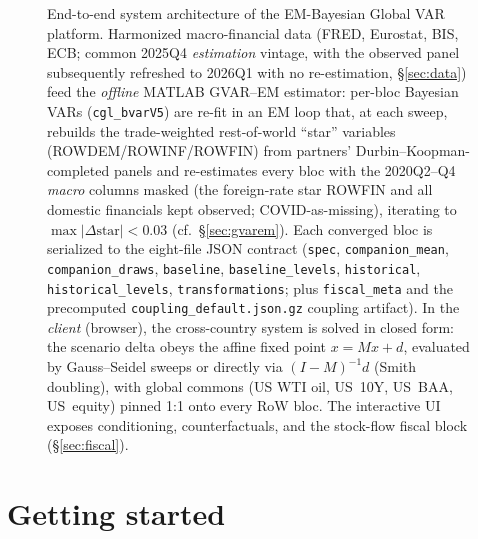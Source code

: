 \documentclass[11pt]{article}
\theoremstyle{plain}
\theoremstyle{remark}
\begin{document}
\begin{figure}[!ht]
{%
}
\caption[End-to-end system architecture]{End-to-end system architecture of the EM-Bayesian Global VAR platform.
Harmonized macro-financial data (FRED, Eurostat, BIS, ECB; common 2025Q4 \emph{estimation} vintage, with
the observed panel subsequently refreshed to 2026Q1 with no re-estimation, \S\ref{sec:data}) feed the
\emph{offline} MATLAB GVAR--EM estimator: per-bloc Bayesian VARs (\texttt{cgl\_bvarV5}) are re-fit in an
EM loop that, at each sweep, rebuilds the trade-weighted rest-of-world ``star'' variables
(ROWDEM/ROWINF/ROWFIN) from partners' Durbin--Koopman-completed panels and re-estimates every bloc with
the 2020Q2--Q4 \emph{macro} columns masked (the foreign-rate star ROWFIN and all domestic financials kept
observed; COVID-as-missing), iterating to $\max|\Delta\text{star}|<0.03$ (cf.\ \S\ref{sec:gvarem}). Each
converged bloc is serialized to the eight-file JSON contract (\texttt{spec}, \texttt{companion\_mean},
\texttt{companion\_draws}, \texttt{baseline}, \texttt{baseline\_levels}, \texttt{historical},
\texttt{historical\_levels}, \texttt{transformations}; plus \texttt{fiscal\_meta} and the precomputed
\texttt{coupling\_default.json.gz} coupling artifact). In the \emph{client} (browser), the cross-country
system is solved in closed form: the scenario delta obeys the affine fixed point $x = Mx + d$, evaluated by
Gauss--Seidel sweeps or directly via $(I-M)^{-1}d$ (Smith doubling), with global commons (US WTI oil,
US~10Y, US~BAA, US~equity) pinned 1:1 onto every RoW bloc. The interactive UI exposes conditioning,
counterfactuals, and the stock-flow fiscal block (\S\ref{sec:fiscal}).}
\label{fig:architecture}
\end{figure}
\section{Getting started}\label{sec:start}
\end{document}
